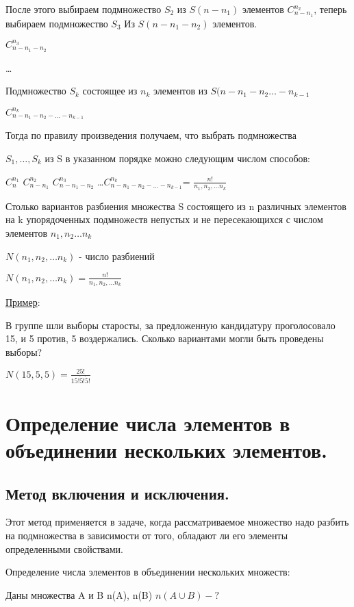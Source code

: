 \documentclass[12pt, a4paper, oneside]{article}
\theoremstyle{plain} %
\theoremstyle{definition}
\begin{document}
После этого выбираем подмножество $S_2$ из $S(n-{n_1})$ элементов $C_{n-{n_1}}^{n_2} $, теперь выбираем подмножество $S_3$ Из $S(n-{n_1}-{n_2})$ элементов. 

$C_{n-{n_1}-{n_2}}^{n_3} $

\dots

Подмножество $S_k$ состоящее из $n_k$ элементов из $S(n-{n_1}-{n_2}\dots -{n_{k-1}}$  

$C_{n-{n_1}-{n_2}- ...-{n_{k-1}}}^{n_k} $

Тогда по правилу произведения получаем, что выбрать подмножества 

$S_1, \dots , S_k$ из S в указанном порядке можно следующим числом способов:


$C_{n}^{n_1} $
\cdot$C_{n-{n_1}}^{n_2} $
\cdot$C_{n-{n_1}-{n_2}}^{n_3} $
\dots \cdot$C_{n-{n_1}-{n_2}- ...-{n_{k-1}}}^{n_k} $= $\frac{n!}{n_1,n_2,\dots n_k}$

Столько вариантов разбиения множества S состоящего из n различных элементов на k упорядоченных подмножеств непустых и не пересекающихся с числом элементов $n_1,n_2 \dots n_k$

$N(n_1,n_2,\dots n_k)$ - число разбиений

$N(n_1,n_2,\dots n_k) = \frac{n!}{n_1,n_2,\dots n_k}$

\underline{Пример}:

В группе шли выборы старосты, за предложенную кандидатуру проголосовало 15, и 5 против, 5 воздержались. Сколько вариантами могли быть проведены выборы?

$N(15,5,5) = \frac{25!}{15!\dot5!\dot5!}$

\section{Определение числа элементов в объединении нескольких элементов.}

\subsection{Метод включения и исключения.}

Этот метод применяется в задаче, когда рассматриваемое множество надо разбить на подмножества в зависимости от того, обладают ли его элементы определенными свойствами. 

Определение числа элементов в объединении нескольких множеств:

Даны множества A и B
n(A), n(B) 
$n(A \cup B) -?$ 
\end{document}
